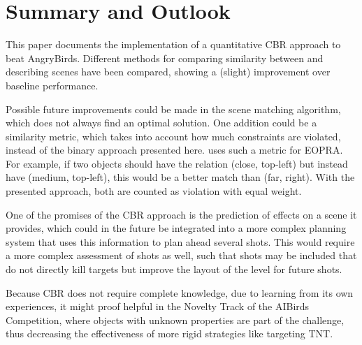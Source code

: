 \section{Summary and Outlook}\label{sec:outlook}
This paper documents the implementation of a quantitative \ac{CBR} approach to beat AngryBirds. Different methods for comparing similarity between and describing scenes have been compared, showing a (slight) improvement over baseline performance.

Possible future improvements could be made in the scene matching algorithm, which does not always find an optimal solution.
One addition could be a similarity metric, which takes into account how much constraints are violated, instead of the binary approach presented here.
\cite{QCBR} uses such a metric for \ac{EOPRA}. For example, if two objects should have the relation (close, top-left) but instead have (medium, top-left), this would be a better match than (far, right). With the presented approach, both are counted as violation with equal weight.

One of the promises of the \ac{CBR} approach is the prediction of effects on a scene it provides, which could in the future be integrated into a more complex planning system that uses this information to plan ahead several shots.
This would require a more complex assessment of shots as well, such that shots may be included that do not directly kill targets but improve the  layout of the level for future shots.

Because \ac{CBR} does not require complete knowledge, due to learning from its own experiences, it might proof helpful in the Novelty Track of the AIBirds Competition, where objects with unknown properties are part of the challenge, thus decreasing the effectiveness of more rigid strategies like targeting TNT.
